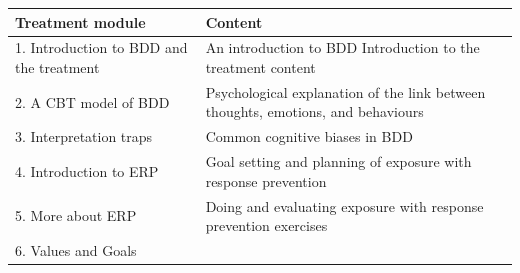 \documentclass[]{book}
\theoremstyle{definition}
\theoremstyle{definition}
\theoremstyle{definition}
\theoremstyle{remark}
\begin{document}
\begin{longtable}[]{@{}ll@{}}
\toprule
\begin{minipage}[b]{0.47\columnwidth}\raggedright
\textbf{Treatment module}\strut
\end{minipage} & \begin{minipage}[b]{0.47\columnwidth}\raggedright
\textbf{Content}\strut
\end{minipage}\tabularnewline
\midrule
\endhead
\begin{minipage}[t]{0.47\columnwidth}\raggedright
1. Introduction to BDD and the treatment\strut
\end{minipage} & \begin{minipage}[t]{0.47\columnwidth}\raggedright
An introduction to BDD Introduction to the treatment content\strut
\end{minipage}\tabularnewline
\begin{minipage}[t]{0.47\columnwidth}\raggedright
2. A CBT model of BDD\strut
\end{minipage} & \begin{minipage}[t]{0.47\columnwidth}\raggedright
Psychological explanation of the link between thoughts, emotions, and
behaviours\strut
\end{minipage}\tabularnewline
\begin{minipage}[t]{0.47\columnwidth}\raggedright
3. Interpretation traps\strut
\end{minipage} & \begin{minipage}[t]{0.47\columnwidth}\raggedright
Common cognitive biases in BDD\strut
\end{minipage}\tabularnewline
\begin{minipage}[t]{0.47\columnwidth}\raggedright
4. Introduction to ERP\strut
\end{minipage} & \begin{minipage}[t]{0.47\columnwidth}\raggedright
Goal setting and planning of exposure with response prevention\strut
\end{minipage}\tabularnewline
\begin{minipage}[t]{0.47\columnwidth}\raggedright
5. More about ERP\strut
\end{minipage} & \begin{minipage}[t]{0.47\columnwidth}\raggedright
Doing and evaluating exposure with response prevention exercises\strut
\end{minipage}\tabularnewline
\begin{minipage}[t]{0.47\columnwidth}\raggedright
6. Values and Goals\strut
\end{minipage} & \begin{minipage}[t]{0.47\columnwidth}\raggedright

\end{minipage}
\end{longtable}
\end{document}
